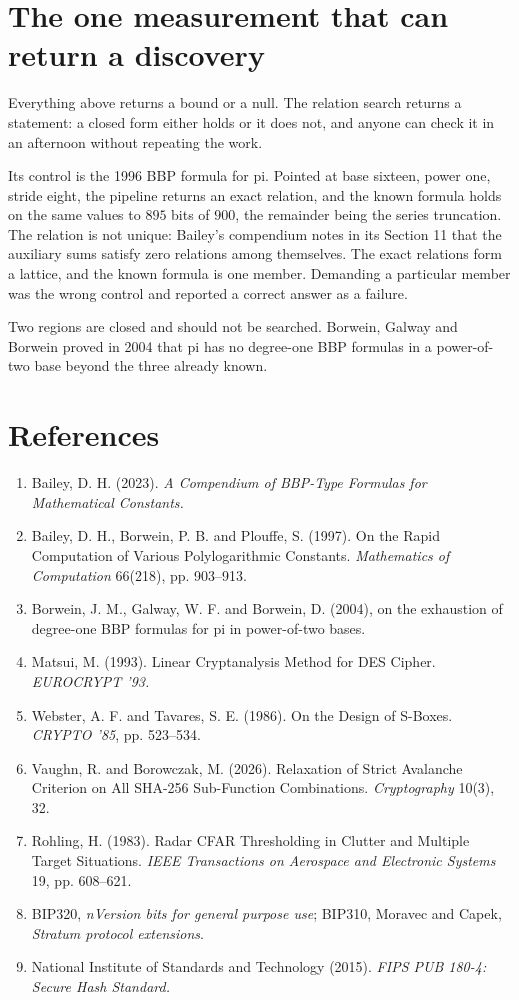 \section{The one measurement that can return a discovery}

Everything above returns a bound or a null. The relation search returns a statement: a closed form either holds or it does not, and anyone can check it in an afternoon without repeating the work.

Its control is the 1996 BBP formula for pi. Pointed at base sixteen, power one, stride eight, the pipeline returns an exact relation, and the known formula holds on the same values to \(895\) bits of \(900\), the remainder being the series truncation. The relation is not unique: Bailey's compendium notes in its Section 11 that the auxiliary sums satisfy zero relations among themselves. The exact relations form a lattice, and the known formula is one member. Demanding a particular member was the wrong control and reported a correct answer as a failure.

Two regions are closed and should not be searched. Borwein, Galway and Borwein proved in 2004 that pi has no degree-one BBP formulas in a power-of-two base beyond the three already known.

\section{References}

\begin{enumerate}
  \item Bailey, D. H. (2023). \emph{A Compendium of BBP-Type Formulas for Mathematical Constants.}
  \item Bailey, D. H., Borwein, P. B. and Plouffe, S. (1997). On the Rapid Computation of Various Polylogarithmic Constants. \emph{Mathematics of Computation} 66(218), pp. 903--913.
  \item Borwein, J. M., Galway, W. F. and Borwein, D. (2004), on the exhaustion of degree-one BBP formulas for pi in power-of-two bases.
  \item Matsui, M. (1993). Linear Cryptanalysis Method for DES Cipher. \emph{EUROCRYPT '93.}
  \item Webster, A. F. and Tavares, S. E. (1986). On the Design of S-Boxes. \emph{CRYPTO '85}, pp. 523--534.
  \item Vaughn, R. and Borowczak, M. (2026). Relaxation of Strict Avalanche Criterion on All SHA-256 Sub-Function Combinations. \emph{Cryptography} 10(3), 32.
  \item Rohling, H. (1983). Radar CFAR Thresholding in Clutter and Multiple Target Situations. \emph{IEEE Transactions on Aerospace and Electronic Systems} 19, pp. 608--621.
  \item BIP320, \emph{nVersion bits for general purpose use}; BIP310, Moravec and Capek, \emph{Stratum protocol extensions}.
  \item National Institute of Standards and Technology (2015). \emph{FIPS PUB 180-4: Secure Hash Standard.}
\end{enumerate}

